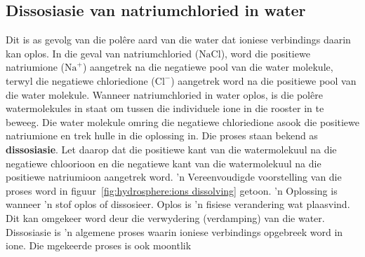 
\subsection*{Dissosiasie van natriumchloried in water}       
Dit is as gevolg van die pol\^{e}re aard van die water dat ioniese verbindings daarin kan oplos. In die geval van natriumchloried ($\text{NaCl}$), word die positiewe natriumione (${\text{Na}}^{+}$) aangetrek na die negatiewe pool van die water molekule, terwyl die negatiewe chloriedione (${\text{Cl}}^{-}$) aangetrek word na die positiewe pool van die water molekule. Wanneer natriumchloried in water oplos, is die polêre watermolekules in staat om tussen die individuele ione in die rooster in te beweeg. Die water molekule omring die negatiewe chloriedione asook die positiewe natriumione en trek hulle in die oplossing in. Die proses staan bekend as \textbf{dissosiasie}. Let daarop dat die positiewe kant van die watermolekuul na die negatiewe chloorioon en die negatiewe kant van die watermolekuul na die positiewe natriumioon aangetrek word.   'n Vereenvoudigde voorstelling van die proses word in figuur~\ref{fig:hydrosphere:ions dissolving} getoon.   'n Oplossing is wanneer   'n stof oplos of dissosieer. Oplos is  'n fisiese verandering wat plaasvind.  Dit kan omgekeer word deur die verwydering (verdamping) van die water.
\label{m38720*fhsst!!!underscore!!!id155}
 {Dissosiasie is  'n algemene proses waarin ioniese verbindings opgebreek word in ione. Die  mgekeerde proses is ook moontlik } 
    \setcounter{subfigure}{0}
